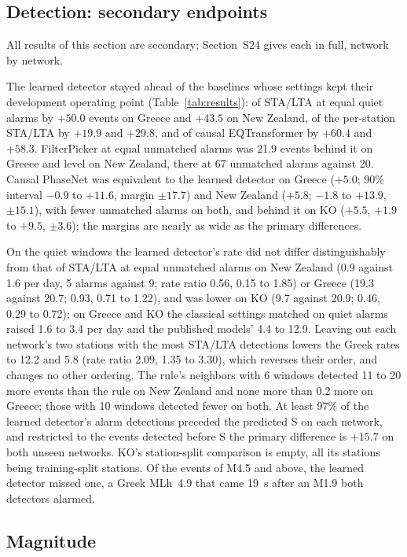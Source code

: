 \documentclass[a4paper,fleqn]{cas-sc}
\newcommand{\stalta}{STA/LTA}
\begin{document}
\subsection{Detection: secondary endpoints}\label{sec:secondary}

All results of this section are secondary; Section~S24 gives each in full, network by
network.

The learned detector stayed ahead of the baselines whose settings kept their
development operating point (Table~\ref{tab:results}): of \stalta{} at equal quiet
alarms by $+50.0$ events on Greece and $+43.5$ on New Zealand, of the per-station
\stalta{} by $+19.9$ and $+29.8$, and of causal EQTransformer by $+60.4$ and $+58.3$.
FilterPicker at equal unmatched alarms was 21.9 events behind it on Greece and level
on New Zealand, there at 67 unmatched alarms against 20. Causal PhaseNet was
equivalent to the learned detector on Greece ($+5.0$; 90\% interval $-0.9$ to
$+11.6$, margin $\pm 17.7$) and New Zealand ($+5.8$; $-1.8$ to $+13.9$, $\pm 15.1$),
with fewer unmatched alarms on both, and behind it on KO ($+5.5$, $+1.9$ to $+9.5$,
$\pm 3.6$); the margins are nearly as wide as the primary
differences.

On the quiet windows the learned detector's rate did not differ distinguishably from
that of \stalta{} at equal unmatched alarms on New Zealand (0.9 against 1.6 per day, 5
alarms against 9; rate ratio 0.56, 0.15 to 1.85) or Greece (19.3 against 20.7; 0.93,
0.71 to 1.22), and was lower on KO (9.7 against 20.9; 0.46, 0.29 to 0.72); on Greece and KO the classical settings matched on quiet alarms raised
1.6 to 3.4 per day and the published models' 4.4 to 12.9. Leaving out each network's
two stations with the most \stalta{} detections lowers the Greek rates to 12.2 and
5.8 (rate ratio 2.09, 1.35 to 3.30), which reverses their order, and changes no other ordering. The
rule's neighbors with 6 windows detected 11 to 20 more events than the rule on New
Zealand and none more than 0.2 more on Greece; those with 10 windows detected fewer on
both. At least 97\% of the learned detector's alarm detections preceded the predicted
S on each network, and restricted to the events detected before S the primary
difference is $+15.7$ on both unseen networks. KO's station-split comparison is
empty, all its stations being training-split stations. Of the events of M4.5 and
above, the learned detector missed one, a Greek MLh~4.9 that came 19~s after an M1.9
both detectors alarmed.

\subsection{Magnitude}\label{sec:magnitude-results}
\end{document}
